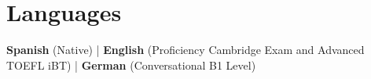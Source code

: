 \renewcommand{\subsection}[3]{
    \noindent\textbf{#1}  \emph{#2} \hfill #3 \break
}

\section{Languages}
\textbf{Spanish} (Native) | \textbf{English} (Proficiency Cambridge Exam and Advanced TOEFL iBT) | \textbf{German} (Conversational B1 Level)

